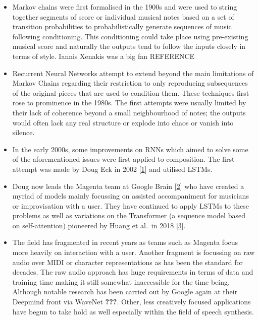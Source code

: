\documentclass[12pt,]{article}
\providecommand{\tightlist}{%
  \setlength{\itemsep}{0pt}\setlength{\parskip}{0pt}}
\begin{document}
\begin{itemize}
\tightlist
\item
  Markov chains were first formalised in the 1900s and were used to
  string together segments of score or individual musical notes based on
  a set of transition probabilities to probabilistically generate
  sequences of music following conditioning. This conditioning could
  take place using pre-existing musical score and naturally the outputs
  tend to follow the inputs closely in terms of style. Iannis Xenakis
  was a big fan REFERENCE
\item
  Recurrent Neural Networks attempt to extend beyond the main
  limitations of Markov Chains regarding their restriction to only
  reproducing subsequences of the original pieces that are used to
  condition them. These techniques first rose to prominence in the
  1980s. The first attempts were usually limited by their lack of
  coherence beyond a small neighbourhood of notes; the outputs would
  often lack any real structure or explode into chaos or vanish into
  silence.
\item
  In the early 2000s, some improvements on RNNs which aimed to solve
  some of the aforementioned issues were first applied to composition.
  The first attempt was made by Doug Eck in 2002
  {[}\protect\hyperlink{ref-eck2002finding}{1}{]} and utilised LSTMs.
\item
  Doug now leads the Magenta team at Google Brain
  {[}\protect\hyperlink{ref-magenta}{2}{]} who have created a myriad of
  models mainly focussing on assisted accompaniment for musicians or
  improvisation with a user. They have continued to apply LSTMs to these
  problems as well as variations on the Transformer (a sequence model
  based on self-attention) pioneered by Huang et al.~in 2018
  {[}\protect\hyperlink{ref-huang2018improved}{3}{]}.
\item
  The field has fragmented in recent years as teams such as Magenta
  focus more heavily on interaction with a user. Another fragment is
  focussing on raw audio over MIDI or character representations as has
  been the standard for decades. The raw audio approach has huge
  requirements in terms of data and training time making it still
  somewhat inaccessible for the time being. Although notable research
  has been carried out by Google again at their Deepmind front via
  WaveNet {\textbf{???}}. Other, less creatively focused applications
  have begun to take hold as well especially within the field of speech
  synthesis.
\end{itemize}
\end{document}
